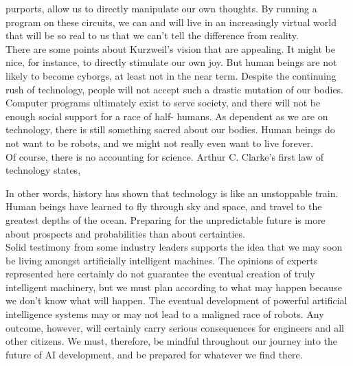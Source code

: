 purports, allow us to directly manipulate our own thoughts. By running a program on
these circuits, we can and will live in an increasingly virtual world that will be so real to
us that we can’t tell the difference from reality.\\
There are some points about Kurzweil’s vision that are appealing. It might be
nice, for instance, to directly stimulate our own joy. But human beings are not likely to
become cyborgs, at least not in the near term. Despite the continuing rush of technology,
people will not accept such a drastic mutation of our bodies. Computer programs
ultimately exist to serve society, and there will not be enough social support for a race of
half- humans. As dependent as we are on technology, there is still something sacred about
our bodies. Human beings do not want to be robots, and we might not really even want
to live forever.\\
Of course, there is no accounting for science. Arthur C. Clarke’s first law of
technology states,
\begin{center}
\end{center}
In other words, history has shown that technology is like an unstoppable train. Human
beings have learned to fly through sky and space, and travel to the greatest depths of the
ocean. Preparing for the unpredictable future is more about prospects and probabilities
than about certainties.\\
Solid testimony from some industry leaders supports the idea that we may soon be
living amongst artificially intelligent machines. The opinions of experts represented here
certainly do not guarantee the eventual creation of truly intelligent machinery, but we
must plan according to what may happen because we don’t know what will happen. The
eventual development of powerful artificial intelligence systems may or may not lead to a
maligned race of robots. Any outcome, however, will certainly carry serious
consequences for engineers and all other citizens. We must, therefore, be mindful
throughout our journey into the future of AI development, and be prepared for whatever
we find there.
